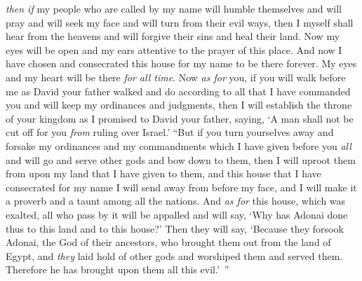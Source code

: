 \begin{biblechapter}
\verse \textit{then if} my people who are called by my name will humble themselves and will pray and will seek my face and will turn from their evil ways, then I myself shall hear from the heavens and will forgive their sins and heal their land.
\verse Now my eyes will be open and my ears attentive to the prayer of this place.
\verse And now I have chosen and consecrated this house for my name to be there forever. My eyes and my heart will be there \textit{for all time}.
\verse Now \textit{as for} you, if you will walk before me as David your father walked and do according to all that I have commanded you and will keep my ordinances and judgments,
\verse then I will establish the throne of your kingdom as I promised to David your father, saying, ‘A man shall not be cut off for you \textit{from} ruling over Israel.’
\verse “But if you turn yourselves away and forsake my ordinances and my commandments which I have given before you \textit{all} and will go and serve other gods and bow down to them,
\verse then I will uproot them from upon my land that I have given to them, and this house that I have consecrated for my name I will send away from before my face, and I will make it a proverb and a taunt among all the nations.
\verse And \textit{as for} this house, which was exalted, all who pass by it will be appalled and will say, ‘Why has Adonai done thus to this land and to this house?’
\verse Then they will say, ‘Because they forsook Adonai, the God of their ancestors, who brought them out from the land of Egypt, and \textit{they} laid hold of other gods and worshiped them and served them. Therefore he has brought upon them all this evil.’ ”
\end{biblechapter}

